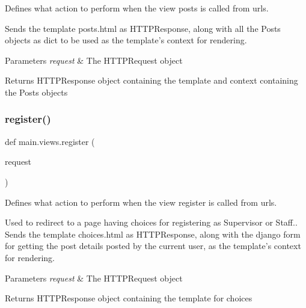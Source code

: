 Defines what action to perform when the view \textquotesingle{}posts\textquotesingle{} is called from urls. 

Sends the template posts.\+html as H\+T\+T\+P\+Response, along with all the Posts objects as dict to be used as the template’s context for rendering. 
\begin{DoxyParams}{Parameters}
{\em request} & The H\+T\+T\+P\+Request object \\
\hline
\end{DoxyParams}
\begin{DoxyReturn}{Returns}
H\+T\+T\+P\+Response object containing the template and context containing the Posts objects 
\end{DoxyReturn}
\mbox{\label{namespacemain_1_1views_a36b45d6ab9335da129aeab31c613726a}} 
\subsubsection{\texorpdfstring{register()}{register()}}
{\footnotesize\ttfamily def main.\+views.\+register (\begin{DoxyParamCaption}\item[{}]{request }\end{DoxyParamCaption})}



Defines what action to perform when the view \textquotesingle{}register\textquotesingle{} is called from urls. 

Used to redirect to a page having choices for registering as Supervisor or Staff.. Sends the template choices.\+html as H\+T\+T\+P\+Response, along with the django form for getting the post details posted by the current user, as the template’s context for rendering. 
\begin{DoxyParams}{Parameters}
{\em request} & The H\+T\+T\+P\+Request object \\
\hline
\end{DoxyParams}
\begin{DoxyReturn}{Returns}
H\+T\+T\+P\+Response object containing the template for choices 
\end{DoxyReturn}
\mbox{\label{namespacemain_1_1views_afa83b35a6a0c354a6d9878bc3584aae4}} 
